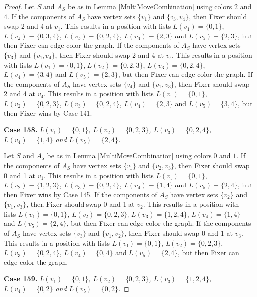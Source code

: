 \documentclass[12pt]{amsart}
\theoremstyle{plain}
\theoremstyle{definition}
\theoremstyle{remark}
\begin{document}
\begin{proof}
Let $S$ and $A_S$ be as in Lemma \ref{MultiMoveCombination} using colors $2$ and $4$. If the components of $A_S$ have vertex sets $\{v_1\}$ and $\{v_3, v_4\}$, then Fixer should swap 2 and 4 at $v_1$. This results in a position with lists $L(v_1) = \{0, 1\}$, $L(v_2) = \{0, 3, 4\}$, $L(v_3) = \{0, 2, 4\}$, $L(v_4) = \{2, 3\}$ and $L(v_5) = \{2, 3\}$, but then Fixer can edge-color the graph.
If the components of $A_S$ have vertex sets $\{v_3\}$ and $\{v_1, v_4\}$, then Fixer should swap 2 and 4 at $v_3$. This results in a position with lists $L(v_1) = \{0, 1\}$, $L(v_2) = \{0, 2, 3\}$, $L(v_3) = \{0, 2, 4\}$, $L(v_4) = \{3, 4\}$ and $L(v_5) = \{2, 3\}$, but then Fixer can edge-color the graph.
If the components of $A_S$ have vertex sets $\{v_4\}$ and $\{v_1, v_3\}$, then Fixer should swap 2 and 4 at $v_4$. This results in a position with lists $L(v_1) = \{0, 1\}$, $L(v_2) = \{0, 2, 3\}$, $L(v_3) = \{0, 2, 4\}$, $L(v_4) = \{2, 3\}$ and $L(v_5) = \{3, 4\}$, but then Fixer wins by Case 141.

\noindent\textbf{Case 158.  }\textit{$L(v_1) = \{0, 1\}$, $L(v_2) = \{0, 2, 3\}$, $L(v_3) = \{0, 2, 4\}$, $L(v_4) = \{1, 4\}$ and $L(v_5) = \{2, 4\}$.}

Let $S$ and $A_S$ be as in Lemma \ref{MultiMoveCombination} using colors $0$ and $1$. If the components of $A_S$ have vertex sets $\{v_1\}$ and $\{v_2, v_3\}$, then Fixer should swap 0 and 1 at $v_1$. This results in a position with lists $L(v_1) = \{0, 1\}$, $L(v_2) = \{1, 2, 3\}$, $L(v_3) = \{0, 2, 4\}$, $L(v_4) = \{1, 4\}$ and $L(v_5) = \{2, 4\}$, but then Fixer wins by Case 145.
If the components of $A_S$ have vertex sets $\{v_2\}$ and $\{v_1, v_3\}$, then Fixer should swap 0 and 1 at $v_2$. This results in a position with lists $L(v_1) = \{0, 1\}$, $L(v_2) = \{0, 2, 3\}$, $L(v_3) = \{1, 2, 4\}$, $L(v_4) = \{1, 4\}$ and $L(v_5) = \{2, 4\}$, but then Fixer can edge-color the graph.
If the components of $A_S$ have vertex sets $\{v_3\}$ and $\{v_1, v_2\}$, then Fixer should swap 0 and 1 at $v_3$. This results in a position with lists $L(v_1) = \{0, 1\}$, $L(v_2) = \{0, 2, 3\}$, $L(v_3) = \{0, 2, 4\}$, $L(v_4) = \{0, 4\}$ and $L(v_5) = \{2, 4\}$, but then Fixer can edge-color the graph.

\noindent\textbf{Case 159.  }\textit{$L(v_1) = \{0, 1\}$, $L(v_2) = \{0, 2, 3\}$, $L(v_3) = \{1, 2, 4\}$, $L(v_4) = \{0, 2\}$ and $L(v_5) = \{0, 2\}$.}


\end{proof}
\end{document}
